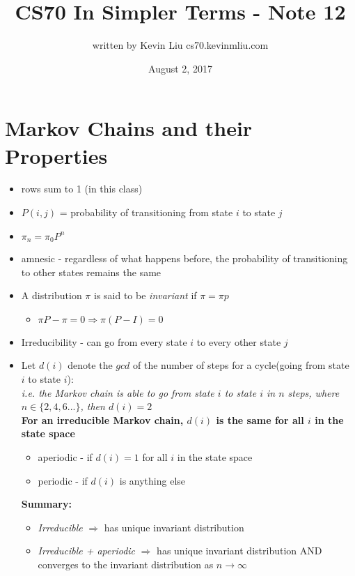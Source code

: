 \documentclass[a4paper]{article}
\title{CS70 In Simpler Terms - Note 12}
\author{written by Kevin Liu cs70.kevinmliu.com}
\date{August 2, 2017}
\begin{document}
\maketitle

\section{Markov Chains and their Properties}
\begin{itemize}
    \item rows sum to 1 (in this class)
    \item $P(i,j)$ = probability of transitioning from state $i$ to state $j$
    \item $\pi_n = \pi_0P^n$
    \item amnesic - regardless of what happens before, the probability of transitioning to other states remains the same
    \item A distribution $\pi$ is said to be \textit{invariant} if $\pi = \pi p$
    \begin{itemize}
        \item $\pi P - \pi = 0 \Rightarrow \pi(P - I) = 0$
    \end{itemize}
    \item Irreducibility - can go from every state $i$ to every other state $j$ \\
    \item Let $d(i)$ denote the $gcd$ of the number of steps for a cycle(going from state $i$ to state $i$): \\\textit{i.e. the Markov chain is able to go from state $i$ to state $i$ in $n$ steps, where $n \in \{2,4,6...\}$, then $d(i) = 2$ }\\ \textbf{For an irreducible Markov chain, $d(i)$ is the same for all $i$ in the state space}
    \begin{itemize}
        \item aperiodic - if $d(i) = 1$ for all $i$ in the state space
        \item periodic - if $d(i)$ is anything else
    \end{itemize}
    \textbf{Summary:}
    \begin{itemize}
        \item \textit{Irreducible} $\Rightarrow$ has unique invariant distribution
        \item \textit{Irreducible + aperiodic} $\Rightarrow$ has unique invariant distribution AND converges to the invariant distribution as $n \rightarrow \infty$
    \end{itemize}
\end{itemize}
\end{document}
